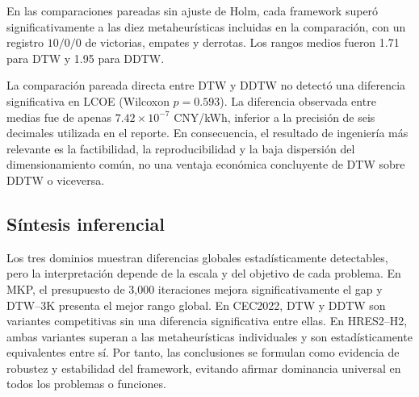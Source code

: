 En las comparaciones pareadas sin ajuste de Holm, cada framework super\'o significativamente a las diez metaheur\'isticas incluidas en la comparaci\'on, con un registro $10/0/0$ de victorias, empates y derrotas. Los rangos medios fueron 1.71 para DTW y 1.95 para DDTW.

La comparaci\'on pareada directa entre DTW y DDTW no detect\'o una diferencia
significativa en LCOE (Wilcoxon $p=0.593$). La diferencia observada entre medias
fue de apenas $7.42\times10^{-7}$ CNY/kWh, inferior a la precisi\'on de seis
decimales utilizada en el reporte. En consecuencia, el resultado de ingenier\'ia
m\'as relevante es la factibilidad, la reproducibilidad y la baja dispersi\'on
del dimensionamiento com\'un, no una ventaja econ\'omica concluyente de DTW sobre
DDTW o viceversa.

\subsection{S\'intesis inferencial}
\label{sec:sintesis-estadistica-es}

Los tres dominios muestran diferencias globales estad\'isticamente detectables,
pero la interpretaci\'on depende de la escala y del objetivo de cada problema.
En MKP, el presupuesto de 3,000 iteraciones mejora significativamente el gap y
DTW--3K presenta el mejor rango global. En CEC2022, DTW y DDTW son variantes
competitivas sin una diferencia significativa entre ellas. En HRES2--H2, ambas
variantes superan a las metaheur\'isticas individuales y son estad\'isticamente
equivalentes entre s\'i. Por tanto, las conclusiones se formulan como evidencia
de robustez y estabilidad del framework, evitando afirmar dominancia universal
en todos los problemas o funciones.
